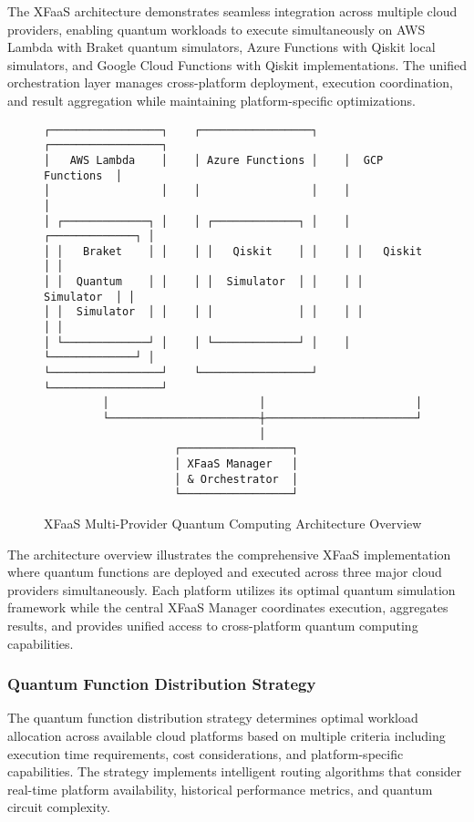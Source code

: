 \documentclass[onecolumn]{IEEEtran}
\begin{document}
The XFaaS architecture demonstrates seamless integration across multiple cloud providers, enabling quantum workloads to execute simultaneously on AWS Lambda with Braket quantum simulators, Azure Functions with Qiskit local simulators, and Google Cloud Functions with Qiskit implementations. The unified orchestration layer manages cross-platform deployment, execution coordination, and result aggregation while maintaining platform-specific optimizations.

\begin{figure}[ht]
\centering
\begin{verbatim}
┌─────────────────┐    ┌─────────────────┐    ┌─────────────────┐
│   AWS Lambda    │    │ Azure Functions │    │  GCP Functions  │
│                 │    │                 │    │                 │
│ ┌─────────────┐ │    │ ┌─────────────┐ │    │ ┌─────────────┐ │
│ │   Braket    │ │    │ │   Qiskit    │ │    │ │   Qiskit    │ │
│ │  Quantum    │ │    │ │  Simulator  │ │    │ │  Simulator  │ │
│ │  Simulator  │ │    │ │             │ │    │ │             │ │
│ └─────────────┘ │    │ └─────────────┘ │    │ └─────────────┘ │
└─────────────────┘    └─────────────────┘    └─────────────────┘
         │                       │                       │
         └───────────────────────┼───────────────────────┘
                                 │
                    ┌─────────────────┐
                    │ XFaaS Manager   │
                    │ & Orchestrator  │
                    └─────────────────┘
\end{verbatim}
\caption{XFaaS Multi-Provider Quantum Computing Architecture Overview}
\label{fig:xfaas_overview}
\end{figure}

The architecture overview illustrates the comprehensive XFaaS implementation where quantum functions are deployed and executed across three major cloud providers simultaneously. Each platform utilizes its optimal quantum simulation framework while the central XFaaS Manager coordinates execution, aggregates results, and provides unified access to cross-platform quantum computing capabilities.

\subsubsection{Quantum Function Distribution Strategy}

The quantum function distribution strategy determines optimal workload allocation across available cloud platforms based on multiple criteria including execution time requirements, cost considerations, and platform-specific capabilities. The strategy implements intelligent routing algorithms that consider real-time platform availability, historical performance metrics, and quantum circuit complexity.
\end{document}
